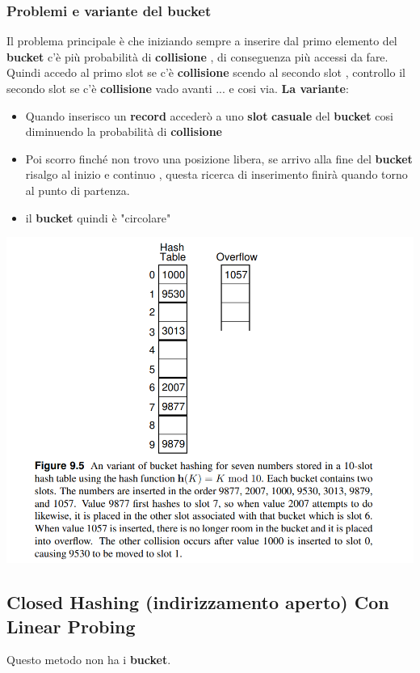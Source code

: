 \subsubsection{Problemi e variante del bucket}
Il problema principale è che iniziando sempre a inserire dal primo elemento del \textbf{bucket} c'è più probabilità di \textbf{collisione} , di conseguenza più accessi da fare. Quindi accedo al primo slot se c'è \textbf{collisione} scendo al secondo slot , controllo il secondo slot se c'è \textbf{collisione} vado avanti ... e cosi via.\newline
\textbf{La variante}:
\begin{itemize}
    \item Quando inserisco un \textbf{record} accederò a uno \textbf{slot} \textbf{casuale} del \textbf{bucket} cosi diminuendo la probabilità di \textbf{collisione}
    \item Poi scorro finché non trovo una posizione libera, se arrivo alla fine del \textbf{bucket} risalgo al inizio e continuo , questa ricerca di inserimento finirà quando torno al punto di partenza.
    \item il \textbf{bucket} quindi è "circolare"
\end{itemize}
\begin{center}
    \includegraphics[scale = 0.6]{Capitoli/HashTable/Esempi/VarianteBuckets.png}
\end{center}
\newpage
\subsection{Closed Hashing (indirizzamento aperto) Con Linear Probing}
Questo metodo non ha i \textbf{bucket}. 
